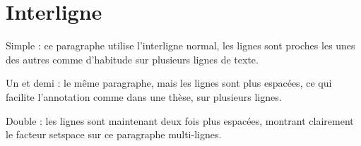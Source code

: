 \documentclass{article}
\begin{document}
\hsize=380pt
\section{Interligne}
Simple : ce paragraphe utilise l'interligne normal, les lignes sont proches les unes des autres comme d'habitude sur plusieurs lignes de texte.

\onehalfspacing
Un et demi : le m\^eme paragraphe, mais les lignes sont plus espac\'ees, ce qui facilite l'annotation comme dans une th\`ese, sur plusieurs lignes.

\doublespacing
Double : les lignes sont maintenant deux fois plus espac\'ees, montrant clairement le facteur setspace sur ce paragraphe multi-lignes.
\end{document}
